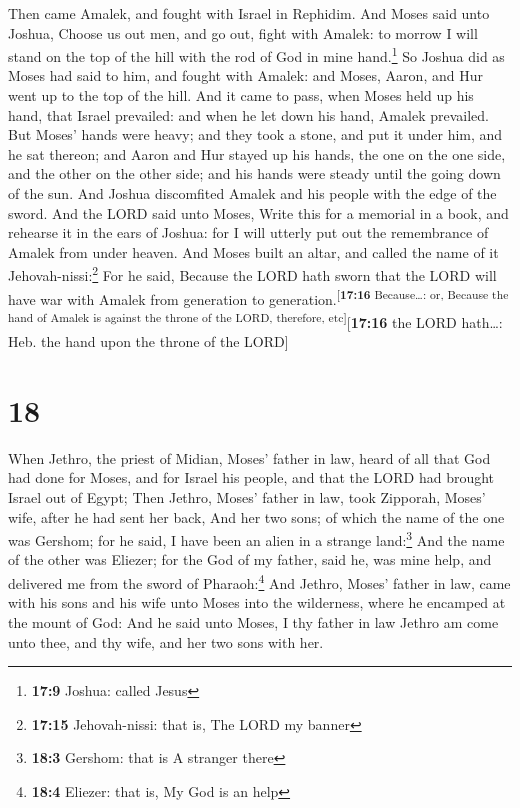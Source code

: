  Then came Amalek, and fought with Israel in Rephidim.
 And Moses said unto Joshua, Choose us out men, and go
out, fight with Amalek: to morrow I will stand on the top of the hill
with the rod of God in mine hand.\footnote{\textbf{17:9} Joshua: called
  Jesus}  So Joshua did as Moses had said to him, and
fought with Amalek: and Moses, Aaron, and Hur went up to the top of the
hill.  And it came to pass, when Moses held up his hand,
that Israel prevailed: and when he let down his hand, Amalek prevailed.
 But Moses' hands were heavy; and they took a stone, and
put it under him, and he sat thereon; and Aaron and Hur stayed up his
hands, the one on the one side, and the other on the other side; and his
hands were steady until the going down of the sun.  And
Joshua discomfited Amalek and his people with the edge of the sword.
 And the LORD said unto Moses, Write this for a memorial
in a book, and rehearse it in the ears of Joshua: for I will utterly put
out the remembrance of Amalek from under heaven.  And
Moses built an altar, and called the name of it
Jehovah-nissi:\footnote{\textbf{17:15} Jehovah-nissi: that is, The LORD
  my banner}  For he said, Because the LORD hath sworn
that the LORD will have war with Amalek from generation to
generation.\textsuperscript{{[}\textbf{17:16} Because\ldots: or, Because
the hand of Amalek is against the throne of the LORD, therefore,
etc{]}}{[}\textbf{17:16} the LORD hath\ldots: Heb. the hand upon the
throne of the LORD{]}

\hypertarget{section-17}{%
\section{18}\label{section-17}}

 When Jethro, the priest of Midian, Moses' father in law,
heard of all that God had done for Moses, and for Israel his people, and
that the LORD had brought Israel out of Egypt;  Then
Jethro, Moses' father in law, took Zipporah, Moses' wife, after he had
sent her back,  And her two sons; of which the name of the
one was Gershom; for he said, I have been an alien in a strange
land:\footnote{\textbf{18:3} Gershom: that is A stranger there}
 And the name of the other was Eliezer; for the God of my
father, said he, was mine help, and delivered me from the sword of
Pharaoh:\footnote{\textbf{18:4} Eliezer: that is, My God is an help}
 And Jethro, Moses' father in law, came with his sons and
his wife unto Moses into the wilderness, where he encamped at the mount
of God:  And he said unto Moses, I thy father in law
Jethro am come unto thee, and thy wife, and her two sons with her.

